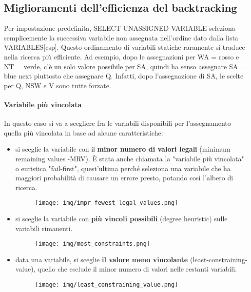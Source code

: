 \subsection{Miglioramenti dell'efficienza del backtracking}
Per impostazione predefinita, SELECT-UNASSIGNED-VARIABLE seleziona semplicemente la successiva variabile non assegnata nell'ordine dato dalla lista VARIABLES[csp]. Questo ordinamento di variabili statiche raramente si traduce nella ricerca più efficiente. Ad esempio, dopo le assegnazioni per WA = rosso e NT = verde, c'è un solo valore possibile per SA, quindi ha senso assegnare SA = blue next piuttosto che assegnare Q. Infatti, dopo l'assegnazione di SA, le scelte per Q, NSW e V sono tutte forzate.
\paragraph{Variabile più vincolata} In questo caso si va a scegliere fra le variabili disponibili per l'assegnamento quella più vincolata in base ad alcune caratteristiche:
\begin{itemize}
    \item si sceglie la variabile con il \textbf{minor numero di valori legali} (minimum remaining values -MRV). È stata anche chiamata la "variabile più vincolata" o euristica "fail-first", quest'ultima perché seleziona una variabile che ha maggiori probabilità di causare un errore presto, potando così l'albero di ricerca.
    \begin{figure}[H]
    	\centering
        \texttt{[image: img/impr\_fewest\_legal\_values.png]}
        \label{fig:fewest_legal_values}
    \end{figure}
    \item si sceglie la variabile con \textbf{più vincoli possibili} (degree heuristic) sulle variabili rimanenti.
    \begin{figure}[H]
    	\centering
        \texttt{[image: img/most\_constraints.png]}
        \label{fig:most_costraint}
    \end{figure}
    \item data una variabile, si sceglie \textbf{il valore meno vincolante} (least-constraining-value), quello che esclude il minor numero di valori nelle restanti variabili.
    \begin{figure}[H]
    	\centering
        \texttt{[image: img/least\_constraining\_value.png]}
        \label{fig:least_constraining_value}
    \end{figure}
\end{itemize}

